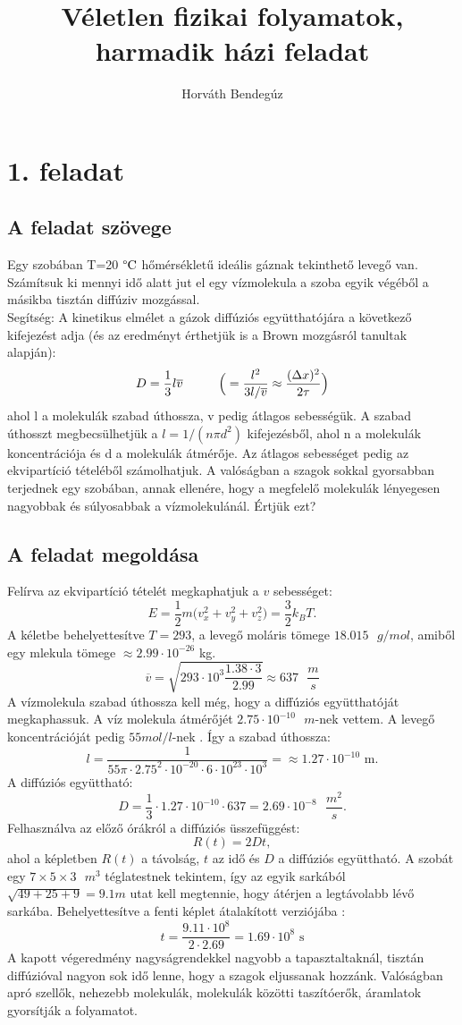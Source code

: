 \documentclass[12pt]{article}
\title{Véletlen fizikai folyamatok, harmadik házi feladat}
\author{Horváth Bendegúz}
\begin{document}
\maketitle
\section*{1. feladat}
\subsection*{A feladat szövege}
Egy szobában T=20$\text{ \textdegree{C}}$ hőmérsékletű ideális gáznak tekinthető levegő van. Számítsuk
ki mennyi idő alatt jut el egy vízmolekula a szoba egyik végéből a másikba tisztán diffúziv mozgással.\\
Segítség:
A kinetikus elmélet a gázok diffúziós együtthatójára a következő kifejezést adja (és az eredményt érthetjük is a Brown mozgásról tanultak alapján):
$$ D = \frac{1}{3}l\overline{v}\hspace{1 cm}\Big (= \frac{l^2}{3l/\overline{v}}\approx\frac{(\Delta x)^2}{2\tau}\Big )$$
     ahol l a molekulák szabad úthossza, v pedig átlagos sebességük. A szabad úthosszt megbecsülhetjük a $l = 1/(n\pi d^2)$ kifejezésből, ahol n a molekulák koncentrációja és d a molekulák átmérője. Az átlagos sebességet pedig az ekvipartíció tételéből számolhatjuk.
A valóságban a szagok sokkal gyorsabban terjednek egy szobában, annak ellenére, hogy a megfelelő molekulák lényegesen nagyobbak és súlyosabbak a vízmolekulánál. Értjük ezt?


\subsection*{A feladat megoldása}
Felírva az ekvipartíció tételét megkaphatjuk a $v$ sebességet:
$$E = \frac{1}{2}m\big (v^2_x+v^2_y+v^2_z \big ) = \frac{3}{2}k_B T.$$
A kéletbe behelyettesítve $T = 293$, a levegő moláris tömege $18.015 \text{ }g/mol$, amiből egy mlekula tömege $\approx 2.99\cdot 10^{-26}$ kg.
 $$\overline{v} = \sqrt{293\cdot 10^3 \frac{1.38\cdot 3}{2.99 }} \approx 637 \text{  }\frac{m}{s} $$
A vízmolekula szabad úthossza kell még, hogy a diffúziós együtthatóját megkaphassuk. A víz molekula átmérőjét $2.75\cdot10^{-10}\text{ }m$-nek vettem\cite{diam}. A levegő koncentrációját pedig $55 mol/l$-nek \cite{conc}.
Így a szabad úthossza:
$$l = \frac{1}{55 \pi\cdot 2.75^2\cdot 10^{-20}\cdot 6\cdot 10^{23}\cdot 10^3} = \approx 1.27 \cdot 10^{-10} \text{ m.}$$
A diffúziós együttható:
$$D = \frac{1}{3}\cdot 1.27\cdot 10^{-10}\cdot 637 = 2.69\cdot 10^{-8} \text{  }\frac{m^2}{s} .$$
Felhasználva az előző órákról a diffúziós üsszefüggést:
$$R(t) = 2Dt,$$
ahol a képletben $R(t)$ a távolság, $t$ az idő és $D$ a diffúziós együttható. A szobát egy $7 \times 5\times 3 \text{  }m^3$ téglatestnek tekintem, így az egyik sarkából $\sqrt{49+25+9} = 9.1 m$ utat kell megtennie, hogy átérjen a legtávolabb lévő sarkába. Behelyettesítve a fenti képlet átalakított verziójába :
$$t =  \frac{9.11\cdot 10^{8}}{2\cdot 2.69  } = 1.69\cdot 10^{8}\text{ s}$$
A kapott végeredmény nagyságrendekkel nagyobb a tapasztaltaknál, tisztán diffúzióval nagyon sok idő lenne, hogy a szagok eljussanak hozzánk. Valóságban apró szellők, nehezebb molekulák, molekulák közötti taszítóerők, áramlatok gyorsítják a folyamatot. 
\newpage
\end{document}
